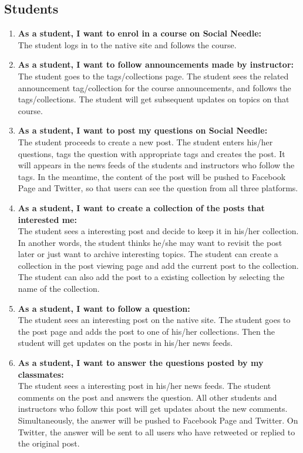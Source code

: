 \subsection{Students}
\begin{enumerate}
	\item \textbf{As a student, I want to enrol in a course on Social Needle:} \\
	The student logs in to the native site and follows the course. 
	
	\item\textbf{ As a student, I want to follow announcements made by instructor:} \\
	The student goes to the tags/collections page. The student sees the related announcement tag/collection for the course announcements, and follows the tags/collections. The student will get subsequent updates on topics on that course. 
	
	\item \textbf{As a student, I want to post my questions on Social Needle:} \\
	The student proceeds to create a new post. The student enters his/her questions, tags the question with appropriate tags and creates the post. It will appears in the news feeds of the students and instructors who follow the tags. In the meantime, the content of the post will be pushed to Facebook Page and Twitter, so that users can see the question from all three platforms.
	
	\item \textbf{As a student, I want to create a collection of the posts that interested me:} \\
	The student sees a interesting post and decide to keep it in his/her collection. In another words, the student thinks he/she may want to revisit the post later or just want to archive interesting topics. The student can create a collection in the post viewing page and add the current post to the collection. The student can also add the post to a existing collection by selecting the name of the collection. 
	
	\item \textbf{As a student, I want to follow a question:} \\
	The student sees an interesting post on the native site. The student goes to the post page and adds the post to one of his/her collections. Then the student will get updates on the posts in his/her news feeds.
	
	\item \textbf{As a student, I want to answer the questions posted by my classmates:} \\
	The student sees a interesting post in his/her news feeds. The student comments on the post and answers the question. All other students and instructors who follow this post will get updates about the new comments. Simultaneously, the answer will be pushed to Facebook Page and Twitter. On Twitter, the answer will be sent to all users who have retweeted or replied to the original post. 

\end{enumerate}

